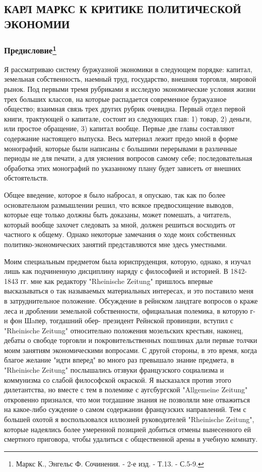 \documentclass[12pt]{article}
\newcommand{\parnum}{(\arabic{parcount})}
\newcounter{parcount}
\newenvironment{parnumbers}{%
  \par%
  \everypar{\noindent \stepcounter{parcount}\marginpar[]{\parnum}}%
}{}
\begin{document}
\subsection{КАРЛ МАРКС К КРИТИКЕ ПОЛИТИЧЕСКОЙ ЭКОНОМИИ}
\subsubsection*{Предисловие\footnote{Маркс К., Энгельс Ф. Сочинения. - 2-е изд. - Т.13. - С.5-9.}}

\begin{parnumbers}
    Я рассматриваю систему буржуазной экономики в следующем порядке: капитал, земельная собственность, наемный труд, государство, внешняя торговля, мировой рынок. Под первыми тремя рубриками я исследую экономические условия жизни трех больших классов, на которые распадается современное буржуазное общество; взаимная связь трех других рубрик очевидна. Первый отдел первой книги, трактующей о капитале, состоит из следующих глав: 1) товар, 2) деньги, или простое обращение, 3) капитал вообще. Первые две главы составляют содержание настоящего выпуска. Весь материал лежит предо мной в форме монографий, которые были написаны с большими перерывами в различные периоды не для печати, а для уяснения вопросов самому себе; последовательная обработка этих монографий по указанному плану будет зависеть от внешних обстоятельств.

    Общее введение, которое я было набросал, я опускаю, так как по более основательном размышлении решил, что всякое предвосхищение выводов, которые еще только должны быть доказаны, может помешать, а читатель, который вообще захочет следовать за мной, должен решиться восходить от частного к общему. Однако некоторые замечания о ходе моих собственных политико-экономических занятий представляются мне здесь уместными.

    Моим специальным предметом была юриспруденция, которую, однако, я изучал лишь как подчиненную дисциплину наряду с философией и историей. В 1842-1843 гг. мне как редактору "Rheinische Zeitung" пришлось впервые высказываться о так называемых материальных интересах, и это поставило меня в затруднительное положение. Обсуждение в рейнском ландтаге вопросов о краже леса и дроблении земельной собственности, официальная полемика, в которую г-н фон Шaпер, тогдашний обер- президент Рейнской провинции, вступил с "Rheinische Zeitung" относительно положения мозельских крестьян, наконец, дебаты о свободе торговли и покровительственных пошлинах дали первые толчки моим занятиям экономическими вопросами. С другой стороны, в это время, когда благое желание "идти вперед" во много раз превышало знание предмета, в "Rheinische Zeitung" послышались отзвуки французского социализма и коммунизма со слабой философской окраской. Я высказался против этого дилетантства, но вместе с тем в полемике с аугсбургской "Allgemeine Zeitung" откровенно признался, что мои тогдашние знания не позволяли мне отважиться на какое-либо суждение о самом содержании французских направлений. Тем с большей охотой я воспользовался иллюзией руководителей "Rheinische Zeitung", которые надеялись более умеренной позицией добиться отмены вынесенного ей смертного приговора, чтобы удалиться с общественной арены в учебную комнату.


\end{parnumbers}
\end{document}
